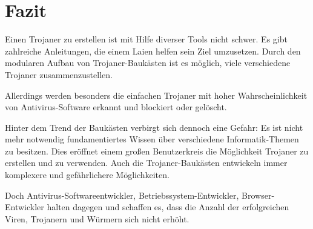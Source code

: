 \pagebreak
\section{Fazit}\label{sec:fazit}
Einen Trojaner zu erstellen ist mit Hilfe diverser Tools nicht schwer.
Es gibt zahlreiche Anleitungen, die einem Laien helfen sein Ziel umzusetzen.
Durch den modularen Aufbau von Trojaner-Baukästen ist es möglich,
viele verschiedene Trojaner zusammenzustellen. 

Allerdings werden 
besonders die einfachen Trojaner mit hoher Wahrscheinlichkeit von Antivirus-Software 
erkannt und blockiert oder gelöscht.

Hinter dem Trend der Baukästen verbirgt sich dennoch eine Gefahr:
Es ist nicht mehr notwendig fundamentiertes Wissen über verschiedene
Informatik-Themen zu besitzen. Dies eröffnet einem großen Benutzerkreis die Möglichkeit
Trojaner zu erstellen und zu verwenden. Auch die Trojaner-Baukästen entwickeln
immer komplexere und gefährlichere Möglichkeiten. 

Doch Antivirus-Softwareentwickler, 
Betriebssystem-Entwickler, Browser-Entwickler halten dagegen und schaffen es, 
dass die Anzahl der erfolgreichen Viren, Trojanern und Würmern sich nicht erhöht. 